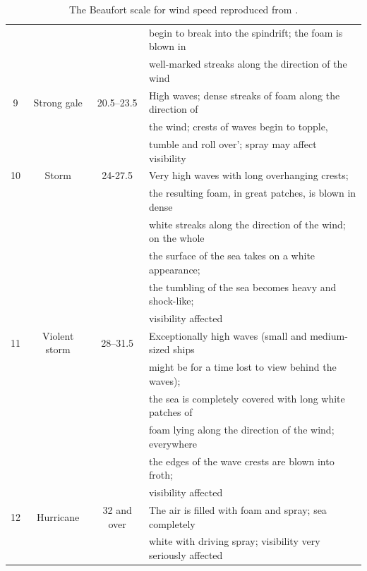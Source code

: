 \begin{table}
\begin{tabular}{|c|c|c|l|}
                &                 &                     & begin to break into the spindrift; the foam is blown in  \\
                &                &                    &  well-marked streaks along the direction of the wind  \\
9               & Strong gale     & 20.5--23.5         & High waves; dense streaks of foam along the direction of \\
                &                 &                    & the wind; crests of waves begin to topple, \\
                &                 &                    &tumble and roll over'; spray may affect visibility  \\
10              & Storm            & 24-27.5            & Very high waves with long overhanging crests; \\
                &                   &                  & the resulting foam, in great patches, is blown in dense \\
                &                  &                 & white streaks along the direction of the wind; on the whole \\
                &                  &                  & the surface of the sea takes on a white appearance; \\
                &                  &                  & the tumbling of the sea becomes heavy and shock-like; \\
                &                  &                  & visibility affected\\
11              & Violent storm    & 28--31.5           & Exceptionally high waves (small and medium-sized ships\\
                &                  &                    & might be for a time lost to view behind the waves); \\
                &                  &                    & the sea is completely covered with long white patches of \\
                &                  &                    & foam lying along the  direction of the wind; everywhere \\
                &                  &                    & the edges of the wave crests are blown into froth; \\
                &                  &                    &  visibility affected \\
12              & Hurricane        & 32 and over        &  The air is filled with foam and spray; sea completely \\
                &                  &                   &  white with driving spray; visibility very seriously affected  \\ 
\hline
\end{tabular}
\caption{The Beaufort scale for wind speed reproduced from \cite{Alcock&Morgan1978}. \label{table_Beaufort}}
\end{table}

